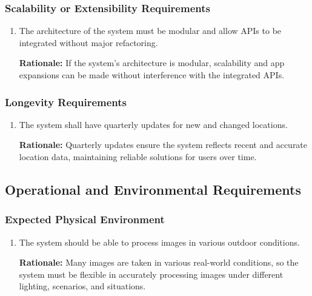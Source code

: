 \documentclass[]{article}
\begin{document}
\subsubsection{Scalability or Extensibility Requirements}
\label{ssub:scalability_or_extensibility_requirements}
\begin{enumerate}[{PR-SE}1. ]
	\item The architecture of the system must be modular and allow APIs to be integrated without major refactoring.
	
	{\bf Rationale:} If the system’s architecture is modular, scalability and app expansions can be made without interference with the integrated APIs.
\end{enumerate}

\subsubsection{Longevity Requirements}
\label{ssub:longevity_requirements}
\begin{enumerate}[{PR-L}1. ]
	\item The system shall have quarterly updates for new and changed locations.
	
	{\bf Rationale:} Quarterly updates ensure the system reflects recent and accurate location data, maintaining reliable solutions for users over time.
\end{enumerate}


\subsection{Operational and Environmental Requirements}
\label{sub:operational_and_environmental_requirements}

\subsubsection{Expected Physical Environment}
\label{ssub:expected_physical_environment}
\begin{enumerate}[{OE-EPE}1. ]
	\item The system should be able to process images in various outdoor conditions.
	
	{\bf Rationale:} Many images are taken in various real-world conditions, so the system must be flexible in accurately processing images under different lighting, scenarios, and situations.
\end{enumerate}
\end{document}
